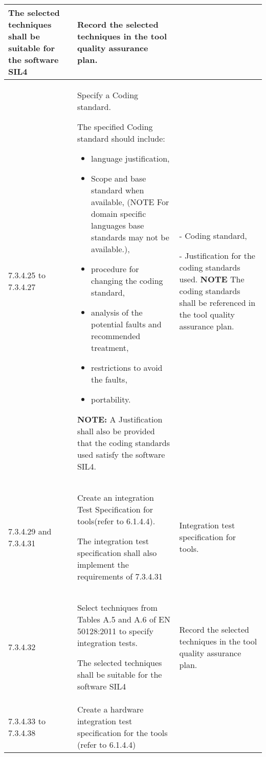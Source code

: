 \documentclass{template/openetcs_report}
\begin{document}
{\begin{longtable}{|p{2cm}|p{9cm}|p{3cm}|}
The selected techniques shall be suitable for the software SIL4
& Record the selected techniques in the tool quality assurance plan.\\ 
\hline
7.3.4.25 to 7.3.4.27 & 
Specify a Coding standard.

The specified Coding standard should include:
\begin{itemize}\itemsep=0pt
  \item language justification,
  \item Scope and base standard when available, (NOTE For domain specific languages base standards may not be available.),
  \item procedure for changing the coding standard,
  \item analysis of the potential faults and recommended treatment,
  \item restrictions to avoid the faults,
  \item portability.
\end{itemize}

\textbf{NOTE:}\linebreak
A Justification shall also be provided that the coding standards used satisfy the software SIL4.
& 
- Coding standard,

- Justification for the coding standards used.
\linebreak
\linebreak
\textbf{NOTE}\linebreak
The coding standards shall be referenced in the tool quality assurance plan.\\ 
\hline
7.3.4.29 and 7.3.4.31 & Create an integration Test Specification for tools(refer to 6.1.4.4).

The integration test specification shall also implement the requirements of 7.3.4.31
& Integration test specification for tools.\\ 
\hline
7.3.4.32 & Select techniques from Tables A.5 and A.6 of EN 50128:2011 to specify integration tests. 

The selected techniques shall be suitable for the software SIL4
& Record the selected techniques in the tool quality assurance plan.\\ 
\hline
7.3.4.33 to 7.3.4.38 & Create a hardware integration test specification for the tools (refer to 6.1.4.4)


\end{longtable}}
\end{document}
